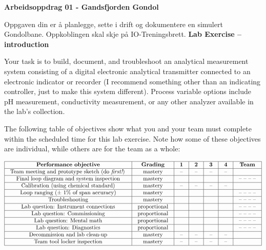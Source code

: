 


\noindent
{\bf Arbeidsoppdrag 01 - Gandsfjorden Gondol}

\vskip 5pt

Oppgaven din er å planlegge, sette i drift og dokumentere en simulert Gondolbane. Oppkoblingen skal skje på IO-Treningsbrett. 
{\bf Lab Exercise -- introduction}

\vskip 5pt

Your task is to build, document, and troubleshoot an analytical measurement system consisting of a digital electronic analytical transmitter connected to an electronic indicator or recorder (I recommend something other than an indicating controller, just to make this system different).  Process variable options include pH measurement, conductivity measurement, or any other analyzer available in the lab's collection.  

The following table of objectives show what you and your team must complete within the scheduled time for this lab exercise.  Note how some of these objectives are individual, while others are for the team as a whole:



$$\vbox{\offinterlineskip
\halign{\strut
\vrule \quad\hfil # \ \hfil & 
\vrule \quad\hfil # \ \hfil & 
\vrule \quad\hfil # \ \hfil & 
\vrule \quad\hfil # \ \hfil & 
\vrule \quad\hfil # \ \hfil & 
\vrule \quad\hfil # \ \hfil & 
\vrule \quad\hfil # \ \hfil \vrule \cr
\noalign{\hrule}
%
{\bf Performance objective} & {\bf Grading} & {\bf 1} & {\bf 2} & {\bf 3} & {\bf 4} & {\bf Team} \cr
%
\noalign{\hrule}
%
Team meeting and prototype sketch (do {\it first!}) & mastery & -- & -- & -- & -- & \cr
%
\noalign{\hrule}
%
Final loop diagram and system inspection & mastery & & & & & -- -- -- -- \cr
%
\noalign{\hrule}
%
Calibration (using chemical standard) & mastery & -- & -- & -- & -- &  \cr
%
\noalign{\hrule}
%
Loop ranging ($\pm$ 1\% of span accuracy) & mastery & & & & & -- -- -- -- \cr
%
\noalign{\hrule}
%
Troubleshooting & mastery & & & & & -- -- -- -- \cr
%
\noalign{\hrule}
%
Lab question: Instrument connections & proportional &  &  &  &  & -- -- -- -- \cr
%
\noalign{\hrule}
%
Lab question: Commissioning & proportional &  &  &  &  & -- -- -- -- \cr
%
\noalign{\hrule}
%
Lab question: Mental math & proportional &  &  &  &  & -- -- -- -- \cr
%
\noalign{\hrule}
%
Lab question: Diagnostics & proportional &  &  &  &  & -- -- -- -- \cr
%
\noalign{\hrule}
%
Decommission and lab clean-up & mastery & -- & -- & -- & -- &  \cr
%
\noalign{\hrule}
%
Team tool locker inspection & mastery & -- & -- & -- & -- &  \cr
%
\noalign{\hrule}
} %
}$$ %

